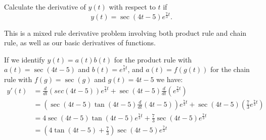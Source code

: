 \documentclass{ximera}
\author{Emma Smith Zbarsky}
\begin{document}
\begin{exercise}

Calculate the derivative of $y(t)$ with respect to $t$ if
\[y(t) = \sec(4t-5)e^{\frac{7}{3}t}.\]


\begin{hint}
This is a mixed rule derivative problem involving both product rule and
chain rule, as well as our basic derivatives of functions.
\end{hint}


\begin{hint}
If we identify $y(t) = a(t)b(t)$ for the product rule with
$a(t) = \sec(4t-5)$ and $b(t) = e^{\frac{7}{3}t}$, and $a(t) = f(g(t))$
for the chain rule with $f(g) = \sec(g)$ and $g(t) = 4t-5$ we have:
\begin{align*}
y'(t) &= \frac{d}{dt}\left(sec(4t-5)\right)e^{\frac{7}{3}t} + \sec(4t-5)\frac{d}{dt}\left(e^{\frac{7}{3}t}\right) \\
&= \left(\sec(4t-5)\tan(4t-5)\frac{d}{dt}(4t-5)\right)e^{\frac{7}{3}t} + \sec(4t-5)\left(\frac{7}{3}e^{\frac{7}{3}t}\right) \\
&= 4\sec(4t-5)\tan(4t-5)e^{\frac{7}{3}t} + \frac{7}{3}\sec(4t-5)e^{\frac{7}{3}t} \\
&= \left(4\tan(4t-5)+\frac{7}{3}\right)\sec(4t-5)e^{\frac{7}{3}t}
\end{align*}
\end{hint}


\begin{multipleChoice}
\end{multipleChoice}

\end{exercise}
\end{document}
